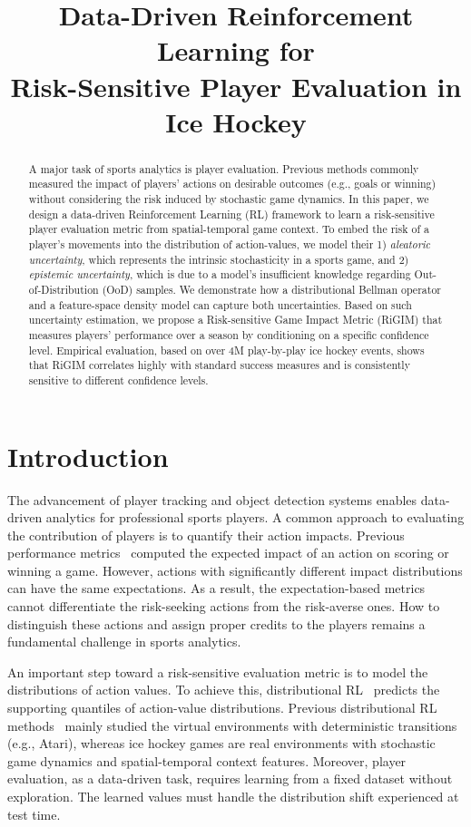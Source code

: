 \documentclass{article}
\title{Data-Driven Reinforcement Learning for \\Risk-Sensitive Player Evaluation in Ice Hockey}
\author{
}
\begin{document}
\maketitle

\begin{abstract}
A major task of sports analytics is player evaluation. Previous methods commonly measured the impact of players' actions on desirable outcomes (e.g., goals or winning) without considering the risk induced by stochastic game dynamics.  In this paper, we design a data-driven Reinforcement Learning (RL) framework to learn a risk-sensitive player evaluation metric from spatial-temporal game context. To embed the risk of a player’s movements into the distribution of action-values, we model their 1) {\it aleatoric uncertainty}, which represents the intrinsic stochasticity in a sports game, and 2) {\it epistemic uncertainty}, which is due to a model's insufficient knowledge regarding Out-of-Distribution (OoD) samples. We demonstrate how a distributional Bellman operator and a feature-space density model can capture both uncertainties. Based on such uncertainty estimation, we propose a Risk-sensitive Game Impact Metric (RiGIM) that measures players' performance over a season by conditioning on a specific confidence level. Empirical evaluation, based on over 4M play-by-play ice hockey events, shows that RiGIM correlates highly with standard success measures and is consistently sensitive to different confidence levels.
\end{abstract}

\section{Introduction}

The advancement of player tracking and object detection systems enables data-driven analytics for professional sports players. A common approach to evaluating the contribution of players is to quantify their action impacts.  Previous performance metrics~\cite{Routley2015Markov,Liu2018DRL,Decroos2019Actions,Luo2020IRL} computed the expected impact of an action on scoring or winning a game. However, actions with significantly different impact distributions can have the same expectations. As a result, the expectation-based metrics cannot differentiate the risk-seeking actions from the risk-averse ones. How to distinguish these actions and assign proper credits to the players remains a fundamental challenge in sports analytics.

An important step toward a risk-sensitive evaluation metric is to model the distributions of action values. To achieve this, distributional RL~\cite{bdr2022} predicts the supporting quantiles of action-value distributions. Previous distributional RL methods~\cite{bellemare2017distributional,Dabney2018DistributionalRL,Mavrin2019DistributionalRL} mainly studied the virtual environments with deterministic transitions (e.g., Atari), whereas ice hockey games are real environments with stochastic game dynamics and spatial-temporal context features. Moreover, player evaluation, as a data-driven task, requires learning from a fixed dataset without exploration. The learned values must handle the distribution shift experienced at test time.
\end{document}
